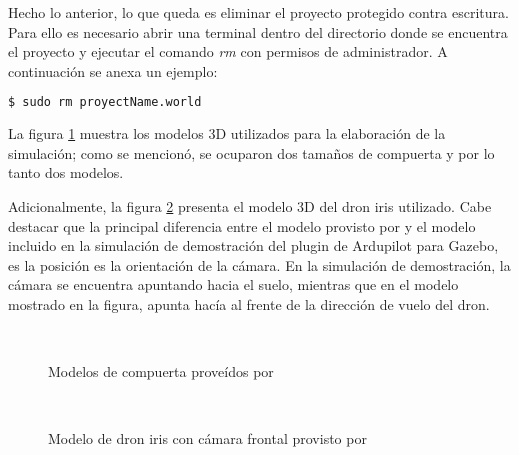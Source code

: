 Hecho lo anterior, lo que queda es eliminar el proyecto protegido contra escritura. Para ello es necesario abrir una terminal dentro del directorio donde se encuentra el proyecto y ejecutar el comando \textit{rm} con permisos de administrador. A continuación se anexa un ejemplo:

\begin{lstlisting}[language = bash]
    $ sudo rm proyectName.world
\end{lstlisting} 

La figura \ref{fig:Gazebo_gates} muestra los modelos 3D utilizados para la elaboración de la simulación; como se mencionó, se ocuparon dos tamaños de compuerta y por lo tanto dos modelos.

Adicionalmente, la figura \ref{fig:Gazebo_iris} presenta el modelo 3D del dron iris utilizado. Cabe destacar que la principal diferencia entre el modelo provisto por y el modelo incluido en la simulación de demostración del plugin de Ardupilot para Gazebo, es la posición es la orientación de la cámara. En la simulación de demostración, la cámara se encuentra apuntando hacia el suelo, mientras que en el modelo mostrado en la figura, apunta hacía al frente de la dirección de vuelo del dron.

\begin{figure}[ht]
    \centering
    \hfill
    \\
    \hfill
    \caption{Modelos de compuerta proveídos por \cite{rojas2020deeppilot}}
    \label{fig:Gazebo_gates}
\end{figure}

\begin{figure}[ht]
    \centering
    \hfill
    \\
    \hfill

    \caption{Modelo de dron iris con cámara frontal provisto por}
    \label{fig:Gazebo_iris}
\end{figure}


